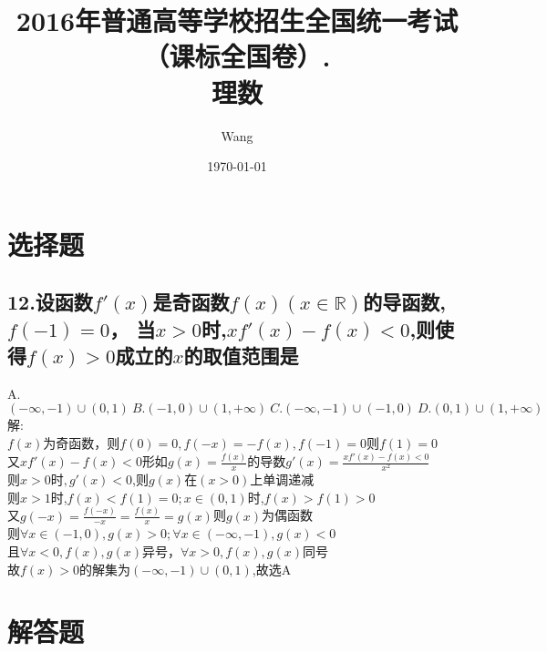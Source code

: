 \documentclass[UTF8]{ctexart}
\begin{document}
\title{2016年普通高等学校招生全国统一考试
    （课标全国卷\uppercase\expandafter{}）.\\
    \textbf{理数}}
\author{Wang}
\date{\today}
\maketitle

\section{选择题}
\subsection{12.设函数$f'(x)$是奇函数$f(x)(x \in \mathbb{R})$的导函数,$f(-1)=0$，
当$x>0$时,$xf'(x)-f(x)<0$,则使得$f(x)>0$成立的$x$的取值范围是}
A.$(-\infty,-1)\cup(0,1)\ B.(-1,0)\cup(1,+\infty)\ 
C.(-\infty,-1)\cup(-1,0)\ D.(0,1)\cup(1,+\infty)$\\

解:\\
$f(x)$为奇函数，则$f(0)=0,f(-x)=-f(x),f(-1)=0$则$f(1)=0$\\
又$xf'(x)-f(x)<0$形如$g(x)=\frac{f(x)}{x}$的导数$g'(x)=\frac{xf'(x)-f(x)<0}{x^2}$\\
则$x>0时,g'(x)<0$,则$g(x)$在$(x>0)$上单调递减\\
则$x>1$时,$f(x)<f(1)=0;x\in(0,1)$时,$f(x)>f(1)>0$\\
又$g(-x)=\frac{f(-x)}{-x}=\frac{f(x)}{x}=g(x)$则$g(x)$为偶函数\\
则$\forall x\in(-1,0),g(x)>0;\forall x\in(-\infty,-1),g(x)<0$\\
且$\forall x<0,f(x),g(x)$异号，$\forall x>0,f(x),g(x)$同号\\
故$f(x)>0$的解集为$(-\infty,-1)\cup(0,1)$,故选A
\section{解答题}
\end{document}
